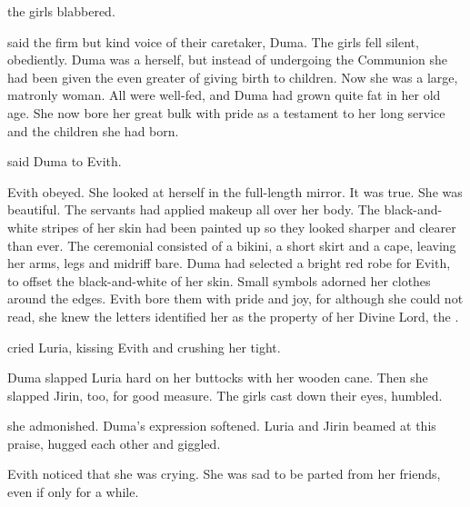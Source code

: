  the girls blabbered.

 said the firm but kind voice of their caretaker, \Mistress Duma. 
The girls fell silent, obediently.
Duma was a \naor herself, but instead of undergoing the Communion she had been given the even greater \honour of giving birth to \naor children. 
Now she was a large, matronly woman. 
All \naorim were well-fed, and Duma had grown quite fat in her old age. 
She now bore her great bulk with pride as a testament to her long service and the children she had born. 

 said Duma to Evith. 

Evith obeyed.
She looked at herself in the full-length mirror. 
It was true.
She was beautiful. 
The servants had applied makeup all over her body. 
The black-and-white stripes of her skin had been painted up so they looked sharper and clearer than ever. 
The ceremonial  consisted of a bikini, a short skirt and a cape, leaving her arms, legs and midriff bare. 
Duma had selected a bright red robe for Evith, to offset the black-and-white of her skin. 
Small symbols adorned her clothes around the edges. 
Evith bore them with pride and joy, for although she could not read, she knew the letters identified her as the property of her Divine Lord, the \ketheran \Teshrial. 



 cried Luria, kissing Evith and crushing her tight. 

Duma slapped Luria hard on her buttocks with her wooden cane.
Then she slapped Jirin, too, for good measure. 
The girls cast down their eyes, humbled. 

 she admonished.
Duma's expression softened.
Luria and Jirin beamed at this praise, hugged each other and giggled. 

Evith noticed that she was crying. 
She was sad to be parted from her friends, even if only for a while.

